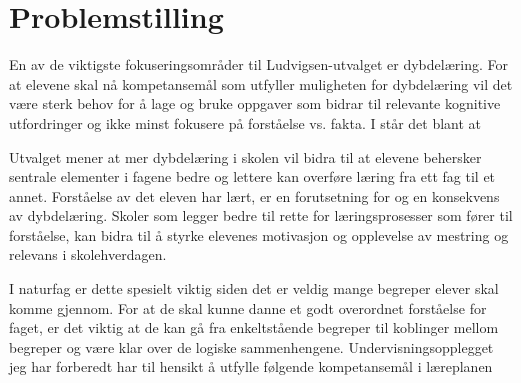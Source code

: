 \documentclass[main.tex]{subfiles}
\begin{document}
\section*{Problemstilling}
En av de viktigste fokuseringsområder til Ludvigsen-utvalget er dybdelæring. For at elevene
skal nå kompetansemål som utfyller muligheten for dybdelæring vil det være sterk behov for å lage og bruke 
oppgaver som bidrar til relevante kognitive utfordringer og ikke minst fokusere på forståelse vs. fakta. 
I  står det blant at

\begin{displayquote}
Utvalget mener at mer dybdelæring i skolen vil bidra til at elevene behersker sentrale elementer
i fagene bedre og lettere kan overføre læring fra ett fag til et annet. Forståelse av det eleven har
lært, er en forutsetning for og en konsekvens av dybdelæring. Skoler som legger bedre til rette for
læringsprosesser som fører til forståelse, kan bidra til å styrke elevenes motivasjon og opplevelse
av mestring og relevans i skolehverdagen.
\end{displayquote}
I naturfag er dette spesielt viktig siden det er veldig mange begreper elever skal komme gjennom. For at de skal
kunne danne et godt overordnet forståelse for faget, er det viktig at de kan gå fra enkeltstående begreper til 
koblinger mellom begreper og være klar over de logiske sammenhengene. 
\newline
\newline
Undervisningsopplegget jeg har forberedt har til hensikt å utfylle følgende kompetansemål  i læreplanen
\end{document}
